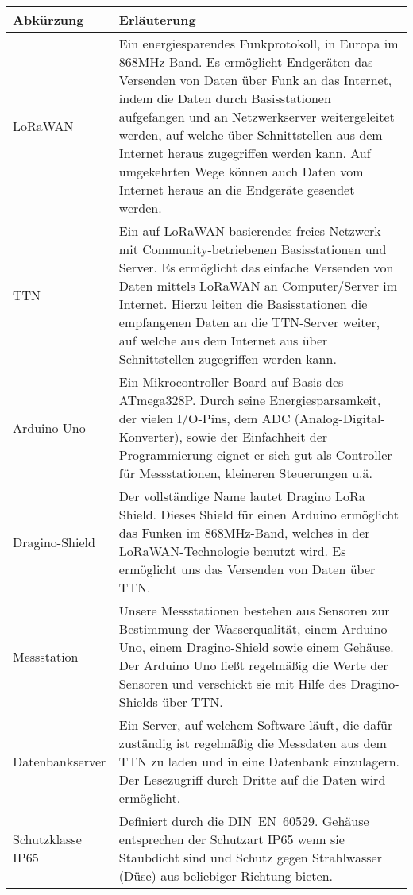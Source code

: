 \begin{table}[H]
	\begin{tabularx}{\textwidth}{ |l|X| }
		\hline  %
		\rowcolor[gray]{.8}%
		\rule{0pt}{18pt}%
		\textbf{Abkürzung} & \textbf{Erläuterung} \\
		\hline  %
		LoRaWAN & Ein energiesparendes Funkprotokoll, in Europa im 868MHz-Band. Es ermöglicht Endgeräten das Versenden von Daten über Funk an das Internet, indem die Daten durch Basisstationen aufgefangen und an Netzwerkserver weitergeleitet werden, auf welche über Schnittstellen aus dem Internet heraus zugegriffen werden kann. Auf umgekehrten Wege können auch Daten vom Internet heraus an die Endgeräte gesendet werden. \\
		\hline
		TTN & Ein auf LoRaWAN basierendes freies Netzwerk mit Community-betriebenen Basisstationen und Server. Es ermöglicht das einfache Versenden von Daten mittels LoRaWAN an Computer/Server im Internet. Hierzu leiten die Basisstationen die empfangenen Daten an die TTN-Server weiter, auf welche aus dem Internet aus über Schnittstellen zugegriffen werden kann. \\
		\hline
		Arduino Uno & Ein Mikrocontroller-Board auf Basis des ATmega328P. Durch seine Energiesparsamkeit, der vielen I/O-Pins, dem ADC (Analog-Digital-Konverter), sowie der Einfachheit der Programmierung eignet er sich gut als Controller für Messstationen, kleineren Steuerungen u.ä. \\
		\hline
		Dragino-Shield & Der vollständige Name lautet Dragino LoRa Shield. Dieses Shield für einen Arduino ermöglicht das Funken im 868MHz-Band, welches in der LoRaWAN-Technologie benutzt wird. Es ermöglicht uns das Versenden von Daten über TTN. \\
		\hline
		Messstation & Unsere Messstationen bestehen aus Sensoren zur Bestimmung der Wasserqualität, einem Arduino Uno, einem Dragino-Shield sowie einem Gehäuse. Der Arduino Uno ließt regelmäßig die Werte der Sensoren und verschickt sie mit Hilfe des Dragino-Shields über TTN. \\
		\hline
		Datenbankserver & Ein Server, auf welchem Software läuft, die dafür zuständig ist regelmäßig die Messdaten aus dem TTN zu laden und in eine Datenbank einzulagern. Der Lesezugriff durch Dritte auf die Daten wird ermöglicht. \\
		\hline
		Schutzklasse IP65 & Definiert durch die DIN~EN~60529. Gehäuse entsprechen der Schutzart IP65 wenn sie Staubdicht sind und Schutz gegen Strahlwasser (Düse) aus beliebiger Richtung bieten. \\

\end{tabularx}
\end{table}
